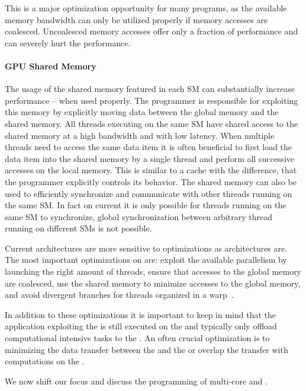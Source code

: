 This is a major optimization opportunity for many \GPU programs, as the available memory bandwidth can only be utilized properly if memory accesses are coalesced.
Uncoalesced memory accesses offer only a fraction of performance and can severely hurt the performance.


\paragraph{GPU Shared Memory}
The usage of the shared memory featured in each SM can substantially increase performance -- when used properly.
The programmer is responsible for exploiting this memory by explicitly moving data between the global memory and the shared memory.
All threads executing on the same SM have shared access to the shared memory at a high bandwidth and with low latency.
When multiple threads need to access the same data item it is often beneficial to first load the data item into the shared memory by a single thread and perform all successive accesses on the local memory.
This is similar to a cache with the difference, that the programmer explicitly controls its behavior.
The shared memory can also be used to efficiently synchronize and communicate with other threads running on the same SM.
In fact on current \GPUs it is only possible for threads running on the same SM to synchronize, global synchronization between arbitrary thread running on different SMs is not possible.

\bigskip
Current \GPU architectures are more sensitive to optimizations as \CPU architectures are.
The most important optimizations on \GPUs are:
exploit the available parallelism by launching the right amount of threads, ensure that accesses to the global memory are coalesced, use the shared memory to minimize accesses to the global memory, and avoid divergent branches for threads organized in a warp~\cite{CUDATuningKepler2015}.

In addition to these optimizations it is important to keep in mind that the application exploiting the \GPU is still executed on the \CPU and typically only offload computational intensive tasks to the \GPU.
An often crucial optimization is to minimizing the data transfer between the \CPU and the \GPU or overlap the transfer with computations on the \GPU.

\bigskip

We now shift our focus and discuss the programming of multi-core \CPUs and \GPUs.




